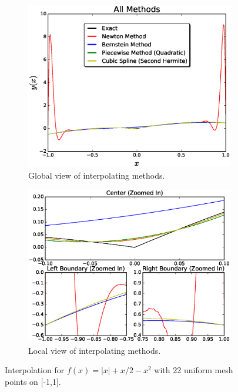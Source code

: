\documentclass[12pt]{article}
\theoremstyle{remark}
\begin{document}
\begin{figure}[H]
	\centering
	\begin{subfigure}{.5\textwidth}
		\centering
		\includegraphics[width=1.1\linewidth]{fig3.eps}
		\caption{Global view of interpolating methods.}
		\label{fig:sub1}
	\end{subfigure}%
	\begin{subfigure}{.5\textwidth}
		\centering
		\includegraphics[width=1.1\linewidth]{subFig3.eps}
		\caption{Local view of interpolating methods.}
		\label{fig:sub2}
	\end{subfigure}
	\caption{Interpolation for $f(x) = \vert x\vert + x/2 - x^2$ with 22 uniform mesh points on [-1,1].}
	\label{fig:test}
\end{figure}
\end{document}
